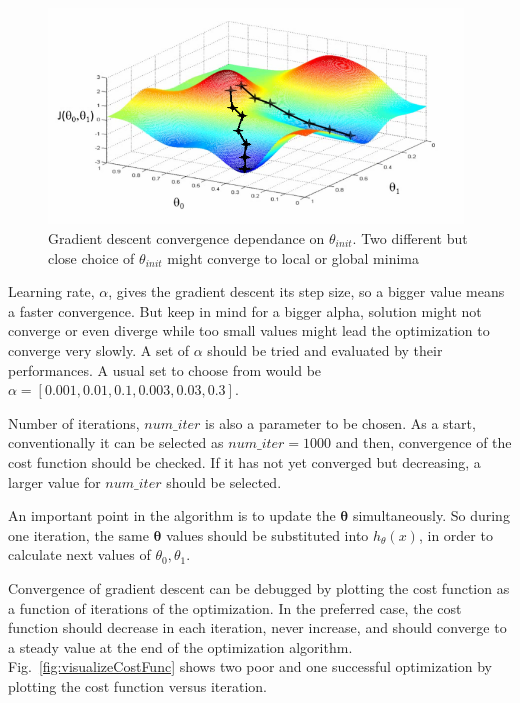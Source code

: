 \begin{figure}
\begin{center}
\includegraphics[width=11cm]{figures/localOrGlobalMinimaGD}    %
\caption{Gradient descent convergence dependance on $\theta_{init}$. Two different but close choice of $\theta_{init}$ might converge to local or global minima \cite{andrewNg_MachLearning}} 
\label{fig:localOrGlobalMinimaGD}
\end{center}
\end{figure}
 
Learning rate,  $\alpha$, gives the gradient descent its step size, so a bigger value means a faster convergence. 
But keep in mind for a bigger alpha, solution might not converge or even diverge while too small values might lead the optimization to converge very slowly.
A set of $\alpha$ should be tried and evaluated by their performances. A usual set to choose from would be $\alpha = [0.001, 0.01, 0.1, 0.003, 0.03, 0.3]$.
  
Number of iterations, $num\_iter$ is also a parameter to be chosen. 
As a start, conventionally it can be selected as $num\_iter = 1000$ and then, convergence of the cost function should be checked. 
If it has not yet converged but decreasing, a larger value for $num\_iter$ should be selected.

An important point in the algorithm is to update the $\bm{\theta}$ simultaneously. 
So during one iteration, the same $\bm{\theta}$ values should be substituted into $h_\theta(x)$, in order to calculate next values of $\theta_0, \theta_1$.
 
Convergence of gradient descent can be debugged by plotting the cost function as a function of iterations of the optimization.
In the preferred case, the cost function should decrease in each iteration, never increase, and should converge to a steady value at the end of the optimization algorithm. 
Fig.~\ref{fig:visualizeCostFunc} shows two poor and one successful optimization by plotting the cost function versus iteration. 

